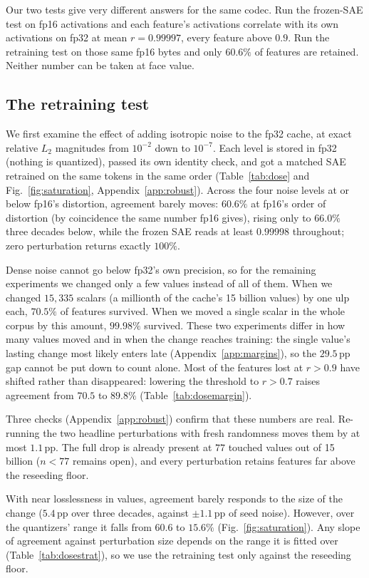 \documentclass{article}
\begin{document}
Our two tests give very different answers for the same codec. Run the
frozen-SAE test on fp16 activations and each feature's activations
correlate with its own activations on fp32 at mean $r = 0.99997$,
every feature above $0.9$. Run the retraining test on those same fp16 bytes
and only $60.6\%$ of features are retained. Neither number can be taken at face value.

\subsection{The retraining test}
\label{sec:dose}

We first examine the effect of adding isotropic noise to the fp32
cache, at exact relative $L_2$ magnitudes from $10^{-2}$ down to
$10^{-7}$. Each level is stored in fp32 (nothing is quantized), passed
its own identity check, and got a matched SAE retrained on the
same tokens in the same order (Table~\ref{tab:dose} and
Fig.~\ref{fig:saturation}, Appendix~\ref{app:robust}). Across the four noise levels at or below
fp16's distortion, agreement barely moves: $60.6\%$ at fp16's order of distortion (by
coincidence the same number fp16 gives), rising only to $66.0\%$ three
decades below, while the frozen SAE
reads at least $0.99998$ throughout; zero perturbation returns
exactly $100\%$.

Dense noise cannot go below fp32's own precision, so for the remaining
experiments we changed only a few values instead of all of them. When
we changed $15{,}335$ scalars (a millionth of the cache's 15 billion
values) by one ulp each, $70.5\%$ of features survived. When we moved a
single scalar in the whole corpus by this amount, $99.98\%$ survived.
These two experiments differ in how many values moved and in when the
change reaches training: the single value's lasting change most likely
enters late (Appendix~\ref{app:margins}), so the $29.5$\,pp gap cannot
be put down to count alone. Most of the features
lost at $r>0.9$ have shifted rather than disappeared: lowering the
threshold to $r>0.7$ raises agreement from $70.5$ to $89.8\%$
(Table~\ref{tab:dosemargin}).

Three checks (Appendix~\ref{app:robust}) confirm that these numbers
are real. Re-running the two headline perturbations with fresh
randomness moves them by at most $1.1$\,pp. The full drop is already
present at $77$ touched values out of 15 billion ($n < 77$ remains
open), and every perturbation retains features far above the
reseeding floor.

With near losslessness in values, agreement barely responds to the size of the change
($5.4$\,pp over three decades, against $\pm1.1$\,pp of seed noise).
However, over the quantizers' range it falls from $60.6$ to
$15.6\%$ (Fig.~\ref{fig:saturation}). Any slope of agreement against
perturbation size depends on the range it is fitted over
(Table~\ref{tab:dosestrat}), so we use the retraining test only
against the reseeding floor.
\end{document}
